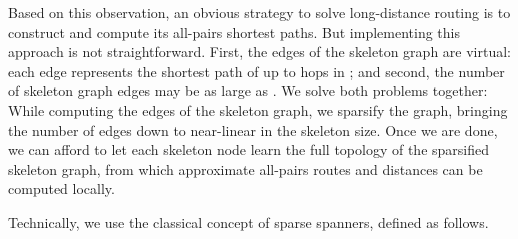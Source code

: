 \documentclass[letterpaper,11pt]{article}
\begin{document}
Based on this observation, an obvious strategy to solve
long-distance routing is  to construct  and 
compute its all-pairs shortest paths. But implementing this approach is not
straightforward. First, the edges of the skeleton graph are virtual: each
edge represents the shortest path of up to  hops in ; and
second, the number of skeleton graph edges may be as large as
. We solve both problems together: While computing the edges of
the skeleton graph, we sparsify the graph, bringing the number of edges
down to near-linear in the skeleton size. Once we are done, we can afford to let  
each skeleton node learn the full topology of the sparsified skeleton
graph, from which approximate all-pairs routes and distances can be computed
locally.

Technically, we use  the classical concept of sparse spanners, defined
as follows.
\end{document}
